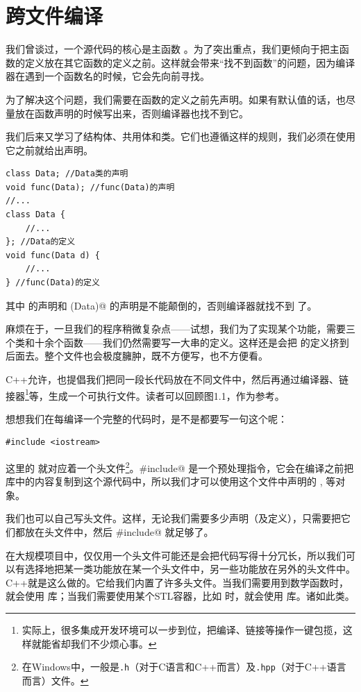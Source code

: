 \section{跨文件编译}
我们曾谈过，一个源代码的核心是主函数 \lstinline@main@。为了突出重点，我们更倾向于把主函数的定义放在其它函数的定义之前。这样就会带来``找不到函数''的问题，因为编译器在遇到一个函数名的时候，它会先向前寻找。\par
为了解决这个问题，我们需要在函数的定义之前先声明。如果有默认值的话，也尽量放在函数声明的时候写出来，否则编译器也找不到它。\par
我们后来又学习了结构体、共用体和类。它们也遵循这样的规则，我们必须在使用它之前就给出声明。
\begin{lstlisting}
class Data; //Data类的声明
void func(Data); //func(Data)的声明
//...
class Data {
    //...
}; //Data的定义
void func(Data d) {
    //...
} //func(Data)的定义
\end{lstlisting}
其中 \lstinline@Data@ 的声明和 \lstinline@func(Data)@ 的声明是不能颠倒的，否则编译器就找不到 \lstinline@Data@ 了。\par
麻烦在于，一旦我们的程序稍微复杂点——试想，我们为了实现某个功能，需要三个类和十余个函数——我们仍然需要写一大串的定义。这样还是会把 \lstinline@main@ 的定义挤到后面去。整个文件也会极度臃肿，既不方便写，也不方便看。\par
C++允许，也提倡我们把同一段长代码放在不同文件中，然后再通过编译器、链接器\footnote{实际上，很多集成开发环境可以一步到位，把编译、链接等操作一键包揽，这样就能省却我们不少烦心事。}等，生成一个可执行文件。读者可以回顾图1.1，作为参考。\par
想想我们在每编译一个完整的代码时，是不是都要写一句这个呢：
\begin{lstlisting}
#include <iostream>
\end{lstlisting}
这里的 \lstinline@iostream@ 就对应着一个头文件\footnote{在Windows中，一般是\texttt{.h}（对于C语言和C++而言）及\texttt{.hpp}（对于C++语言而言）文件。}。\lstinline@#include@ 是一个预处理指令，它会在编译之前把 \lstinline@iostream@ 库中的内容复制到这个源代码中，所以我们才可以使用这个文件中声明的 \lstinline@cin@, \lstinline@cout@ 等对象。\par
我们也可以自己写头文件。这样，无论我们需要多少声明（及定义），只需要把它们都放在头文件中，然后 \lstinline@#include@ 就足够了。\par
在大规模项目中，仅仅用一个头文件可能还是会把代码写得十分冗长，所以我们可以有选择地把某一类功能放在某一个头文件中，另一些功能放在另外的头文件中。C++就是这么做的。它给我们内置了许多头文件。当我们需要用到数学函数时，就会使用 \lstinline@cmath@ 库；当我们需要使用某个STL容器，比如 \lstinline@vector@ 时，就会使用 \lstinline@vector@ 库。诸如此类。\par
